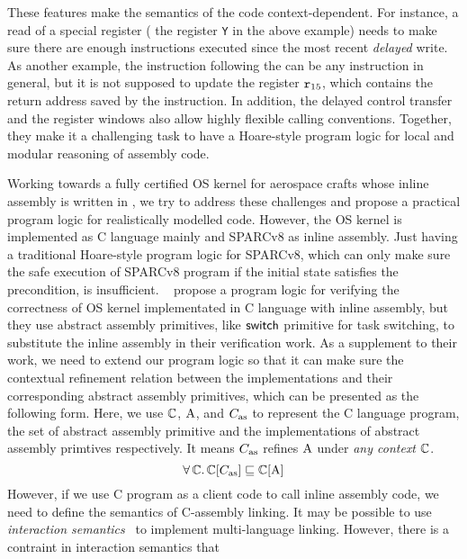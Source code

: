 These features make the semantics of the \sparc{} code
context-dependent. For instance, a read of a special register
(\eg{} the register {\tt Y} in the above example) needs to
make sure there are enough instructions executed since the
most recent {\em delayed} write. As another example,
the instruction following the \call{} can be any
instruction in general, but it is not supposed to
update the register $\texttt{r}_{15}$, which contains the return
address saved by the \call{} instruction.
In addition,
the delayed control transfer
and the register windows also allow highly flexible calling
conventions. Together, they make it a challenging task
to have a Hoare-style program logic for local and modular
reasoning of \sparc{} assembly code.

Working towards a fully certified OS kernel for aerospace
crafts whose inline assembly is written in \sparc,
we try to address these challenges and propose a practical
program logic for realistically modelled \sparc{} code.
However, the OS kernel is implemented as 
C language mainly and SPARCv8 as inline assembly. 
Just having a traditional Hoare-style 
program logic for SPARCv8, which can only make sure 
the safe execution of SPARCv8 program if the initial 
state satisfies the precondition, is insufficient.
~\cite{Xu16cav} propose a program logic for 
verifying the correctness of OS kernel implementated in 
C language with inline assembly, 
but they use abstract assembly primitives, 
like $\mathsf{switch}$ primitive for task switching, to 
substitute the inline assembly in their verification work.
As a supplement to their work, we need to extend our 
program logic so that it can make sure the  
contextual refinement relation between the implementations
and their corresponding abstract assembly primitives, 
which can be presented as the following form. Here,  
we use $\mathbb{C}$, $\text{A}$, and $C_{\text{as}}$ to represent 
the C language program, the set of abstract assembly 
primitive and the implementations of 
abstract assembly primtives respectively. 
It means $C_{\text{as}}$ refines $\text{A}$ under 
\textit{any context} $\mathbb{C}$. 
\[
    \forall \, \mathbb{C}. \, 
    \mathbb{C}[C_{\text{as}}] \sqsubseteq \mathbb{C}[\text{A}]
\]
However, if we use C program as a client code to 
call inline assembly code, we need to define the 
semantics of C-assembly linking. 
It may be possible to use
\textit{interaction semantics}~\cite{Stewart15popl}
to implement multi-language linking. However, 
there is a contraint in interaction semantics that 

